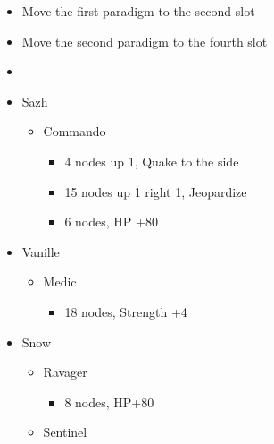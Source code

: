 \vfill
\begin{menu}
		\begin{itemize}
			\paradigm
			\begin{itemize}
				\item Move the first paradigm to the second slot
				\item Move the second paradigm to the fourth slot
				\item {}%
				      {\paradigmline{(\syn)}{\sab}{\rav}}%
				      {\paradigmline{\com}{\sab}{\com}}%
				      {\paradigmline{\syn}{\med}{\com}}%
				      {\paradigmline{\com}{\med}{\com}}%
				      {\paradigmline[5]{\textit{\syn}}{\textit{\sab}}{\textit{\com}}}%
				      {\paradigmline{\com}{\rav}{\com}}
			\end{itemize}
			\crystarium
			\begin{itemize}
				\item Sazh
				      \begin{itemize}
					      \item Commando
					            \begin{itemize}
						            \item 4 nodes up 1, Quake to the side
						            \item 15 nodes up 1 right 1, Jeopardize
						            \item 6 nodes, HP +80
					            \end{itemize}
				      \end{itemize}
				\item Vanille
				      \begin{itemize}
					      \item Medic
					            \begin{itemize}
						            \item 18 nodes, Strength +4
					            \end{itemize}
				      \end{itemize}
				\item Snow
				      \begin{itemize}
					      \item Ravager
					            \begin{itemize}
						            \item 8 nodes, HP+80
					            \end{itemize}
					      \item Sentinel
					            \begin{itemize}

\end{itemize}
\end{itemize}
\end{itemize}
\end{itemize}
\end{menu}
